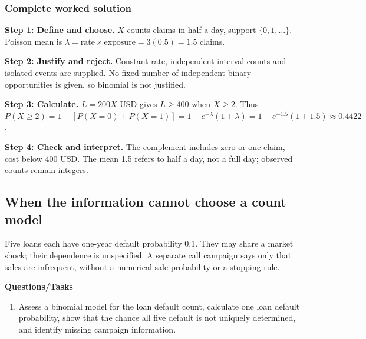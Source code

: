 \subsubsection*{Complete worked solution}
\par\noindent\begin{minipage}{\linewidth}
\textbf{Step 1: Define and choose.} $X$ counts claims in half a day, support $\{0,1,\ldots\}$. Poisson mean is $\lambda=\text{rate}\times\text{exposure}=3(0.5)=1.5$ claims.
\end{minipage}\par\medskip
\par\noindent\begin{minipage}{\linewidth}
\textbf{Step 2: Justify and reject.} Constant rate, independent interval counts and isolated events are supplied. No fixed number of independent binary opportunities is given, so binomial is not justified.
\end{minipage}\par\medskip
\par\noindent\begin{minipage}{\linewidth}
\textbf{Step 3: Calculate.} $L=200X$ USD gives $L\geq400$ when $X\geq2$. Thus $P(X\geq2)=1-[P(X=0)+P(X=1)]=1-e^{-\lambda}(1+\lambda)=1-e^{-1.5}(1+1.5)\approx0.4422$.
\end{minipage}\par\medskip
\par\noindent\begin{minipage}{\linewidth}
\textbf{Step 4: Check and interpret.} The complement includes zero or one claim, cost below 400 USD. The mean 1.5 refers to half a day, not a full day; observed counts remain integers.
\end{minipage}\par\medskip
{}
\subsection{When the information cannot choose a count model}
Five loans each have one-year default probability 0.1. They may share a market shock; their dependence is unspecified. A separate call campaign says only that sales are infrequent, without a numerical sale probability or a stopping rule.

\textbf{Questions/Tasks}
\begin{enumerate}
\item Assess a binomial model for the loan default count, calculate one loan default probability, show that the chance all five default is not uniquely determined, and identify missing campaign information.
\end{enumerate}
